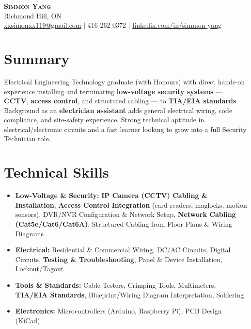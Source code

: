 \documentclass[letterpaper,11pt]{article}
\begin{document}
\begin{center}
    \textbf{\Huge \scshape Simmon Yang} \\ \vspace{1pt}
    Richmond Hill, ON \\
    \href{mailto:xxsimonxx119@gmail.com}{xxsimonxx119@gmail.com} $|$ 416-262-0372 $|$
    \href{https://www.linkedin.com/in/simmon-yang/}{linkedin.com/in/simmon-yang}
\end{center}

\section{Summary}
Electrical Engineering Technology graduate (with Honours) with direct hands-on experience installing and terminating \textbf{low-voltage security systems} --- \textbf{CCTV}, \textbf{access control}, and structured cabling --- to \textbf{TIA/EIA standards}. Background as an \textbf{electrician assistant} adds general electrical wiring, code compliance, and site-safety experience. Strong technical aptitude in electrical/electronic circuits and a fast learner looking to grow into a full Security Technician role.

\section{Technical Skills}
\begin{itemize}[leftmargin=0.15in]
  \item \textbf{Low-Voltage \& Security:} \textbf{IP Camera (CCTV) Cabling \& Installation}, \textbf{Access Control Integration} (card readers, maglocks, motion sensors), DVR/NVR Configuration \& Network Setup, \textbf{Network Cabling (Cat5e/Cat6/Cat6A)}, Structured Cabling from Floor Plans \& Wiring Diagrams
  \item \textbf{Electrical:} Residential \& Commercial Wiring, DC/AC Circuits, Digital Circuits, \textbf{Testing \& Troubleshooting}, Panel \& Device Installation, Lockout/Tagout
  \item \textbf{Tools \& Standards:} Cable Testers, Crimping Tools, Multimeters, \textbf{TIA/EIA Standards}, Blueprint/Wiring Diagram Interpretation, Soldering
  \item \textbf{Electronics:} Microcontrollers (Arduino, Raspberry Pi), PCB Design (KiCad)
\end{itemize}

\end{document}
